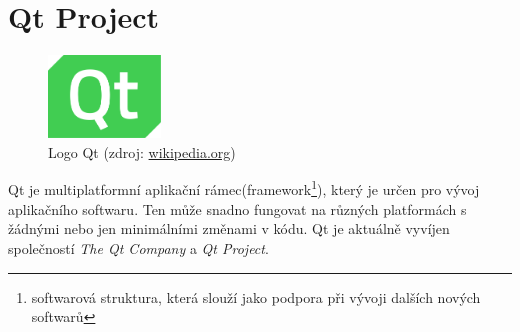 \section{Qt Project}

\begin{figure}[H]
	 \centering
      \includegraphics[width=3cm]{./pictures/qt-logo.png}
      \caption{Logo Qt (zdroj:
\href{https://upload.wikimedia.org/wikipedia/commons/thumb/0/0b/Qt_logo_2016.svg/578px-Qt_logo_2016.svg.png}{wikipedia.org})}
      \label{fig:qt}
  \end{figure}
  
Qt je multiplatformní aplikační rámec(framework\footnote{softwarová struktura, která slouží jako podpora při vývoji dalších nových softwarů}), který je určen pro vývoj aplikačního softwaru. Ten může snadno fungovat na různých platformách s žádnými nebo jen minimálními změnami v kódu. Qt je aktuálně vyvíjen společností \textit{The Qt Company} a \textit{Qt Project}.\cite{qt_wiki, qt}




